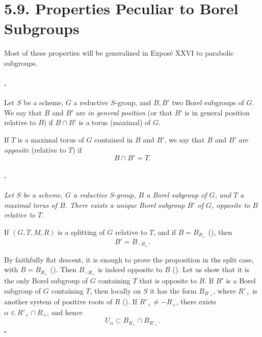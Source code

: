 \section*{5.9. Properties Peculiar to Borel Subgroups}

Most of these properties will be generalized in Exposé XXVI to
parabolic subgroups.

\paragraph{.}
Let \(S\) be a scheme, \(G\) a reductive \(S\)-group, and \(B,B'\)
two Borel subgroups of \(G\). We say that \(B\) and \(B'\) are
\emph{in general position} \textup{(or that \(B'\) is in general
position relative to \(B\))} if \(B\cap B'\) is a torus
\textup{(maximal)} of \(G\).

If \(T\) is a maximal torus of \(G\) contained in \(B\) and \(B'\),
we say that \(B\) and \(B'\) are \emph{opposite} \textup{(relative
to \(T\))} if
\[
  B\cap B'=T.
\]

\paragraph{.}
{\itshape Let \(S\) be a scheme, \(G\) a reductive \(S\)-group, \(B\)
a Borel subgroup of \(G\), and \(T\) a maximal torus of \(B\). There
exists a unique Borel subgroup \(B'\) of \(G\), opposite to \(B\)
relative to \(T\).

If \((G,T,M,R)\) is a splitting of \(G\) relative to \(T\), and if
\(B=B_{R_+}\) \textup{()}, then
\[
  B'=B_{-R_+}.
\]}

By faithfully flat descent, it is enough to prove the proposition in
the split case, with \(B=B_{R_+}\) \textup{()}. Then
\(B_{-R_+}\) is indeed opposite to \(B\) \textup{()}. Let us
show that it is the only Borel subgroup of \(G\) containing \(T\)
that is opposite to \(B\). If \(B'\) is a Borel subgroup of \(G\)
containing \(T\), then locally on \(S\) it has the form
\(B_{R'_+}\), where \(R'_+\) is another system of positive roots of
\(R\) \textup{()}. If \(R'_+\ne -R_+\), there exists
\(\alpha\in R'_+\cap R_+\), and hence
\[
  U_\alpha\subset B_{R_+}\cap B_{R'_+}.
\]
\hfill\(\square\)

